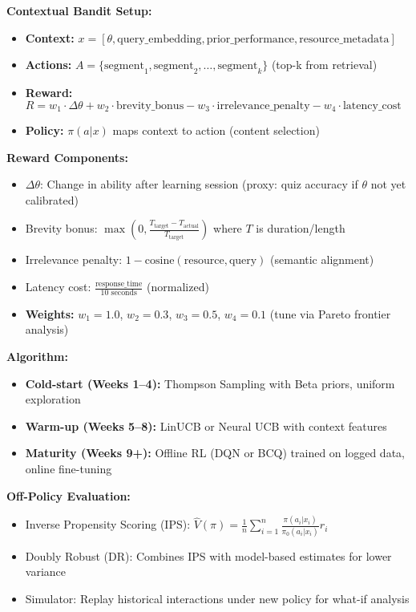 \documentclass[11pt,letterpaper]{article}
\begin{document}
\textbf{Contextual Bandit Setup:}
\begin{itemize}
\item \textbf{Context:} $x = [\theta, \text{query\_embedding}, \text{prior\_performance}, \text{resource\_metadata}]$
\item \textbf{Actions:} $A = \{\text{segment}_1, \text{segment}_2, \ldots, \text{segment}_k\}$ (top-k from retrieval)
\item \textbf{Reward:} $R = w_1 \cdot \Delta\theta + w_2 \cdot \text{brevity\_bonus} - w_3 \cdot \text{irrelevance\_penalty} - w_4 \cdot \text{latency\_cost}$
\item \textbf{Policy:} $\pi(a|x)$ maps context to action (content selection)
\end{itemize}

\textbf{Reward Components:}
\begin{itemize}
\item $\Delta\theta$: Change in ability after learning session (proxy: quiz accuracy if $\theta$ not yet calibrated)
\item Brevity bonus: $\max(0, \frac{T_{\text{target}} - T_{\text{actual}}}{T_{\text{target}}})$ where $T$ is duration/length
\item Irrelevance penalty: $1 - \text{cosine}(\text{resource}, \text{query})$ (semantic alignment)
\item Latency cost: $\frac{\text{response\_time}}{10 \text{ seconds}}$ (normalized)
\item \textbf{Weights:} $w_1 = 1.0$, $w_2 = 0.3$, $w_3 = 0.5$, $w_4 = 0.1$ (tune via Pareto frontier analysis)
\end{itemize}

\textbf{Algorithm:}
\begin{itemize}
\item \textbf{Cold-start (Weeks 1--4):} Thompson Sampling with Beta priors, uniform exploration
\item \textbf{Warm-up (Weeks 5--8):} LinUCB or Neural UCB with context features
\item \textbf{Maturity (Weeks 9+):} Offline RL (DQN or BCQ) trained on logged data, online fine-tuning
\end{itemize}

\textbf{Off-Policy Evaluation:}
\begin{itemize}
\item Inverse Propensity Scoring (IPS): $\hat{V}(\pi) = \frac{1}{n} \sum_{i=1}^{n} \frac{\pi(a_i|x_i)}{\pi_0(a_i|x_i)} r_i$
\item Doubly Robust (DR): Combines IPS with model-based estimates for lower variance
\item Simulator: Replay historical interactions under new policy for what-if analysis
\end{itemize}
\end{document}
